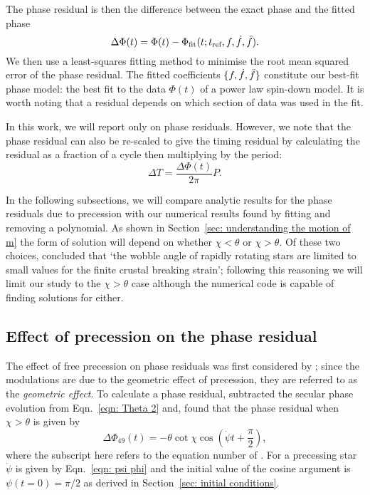 \documentclass[../full_thesis/full_thesis.tex]{subfiles}
\begin{document}
The phase residual is then the difference between the exact phase
and the fitted phase
\begin{equation}
  \Delta\Phi(t) = \Phi(t) - \Phi_{\mathrm{fit}}(t; t_{\textrm{ref}}, f, \dot{f}, \ddot{f}).
\end{equation}
We then use a least-squares fitting method to minimise the root mean squared
error of the phase residual. The fitted coefficients $\{f, \dot{f},
\ddot{f}\}$ constitute our best-fit phase model: the best fit to the data
$\Phi(t)$ of a power law spin-down model.  It is worth noting that a residual
depends on which section of data was used in the fit.

In this work, we will report only on phase residuals. However, we note that the
phase residual can also be re-scaled to give the timing residual by calculating
the residual as a fraction of a cycle then multiplying by the period:
\begin{equation}
    \Delta T = \frac{\Delta\Phi(t)}{2\pi} P.
    \label{eqn: phase to timing}
\end{equation}

In the following subsections, we will compare analytic results for the phase
residuals due to precession with our numerical results found by fitting and
removing a polynomial. As shown in Section~\ref{sec: understanding the motion of m}
the form of solution will depend on whether $\chi < \theta$ or $\chi > \theta$.
Of these two choices, \citet{Jones2001} concluded that `the wobble angle of
rapidly rotating stars are limited to small values for the finite crustal
breaking strain'; following this reasoning we will limit our study to the
$\chi > \theta$ case although the numerical code is capable of finding solutions
for either.

\subsection{Effect of precession on the phase residual}

The effect of free precession on phase residuals was first considered by
\citet{Nelson1990}; since the modulations are due to the geometric effect of
precession, they are referred to as the \emph{geometric effect}. To calculate a
phase residual, \citet{Jones2001} subtracted the secular phase evolution from
Eqn.~\eqref{eqn: Theta 2} and, found that the phase residual when $\chi > \theta$
is given by
\begin{equation}
    \Delta\Phi_{49}(t) = -\theta \cot\chi\cos\left(\dot{\psi}t + \frac{\pi}{2}\right),
    \label{eqn: Jones 49}
\end{equation}
where the subscript here refers to the equation number of \citet{Jones2001}.
For a precessing star $\dot{\psi}$ is given by Eqn.~\eqref{eqn: psi phi} and
the initial value of the cosine argument is $\psi(t=0)=\pi/2$ as derived in
Section~\ref{sec: initial conditions}.
\end{document}
